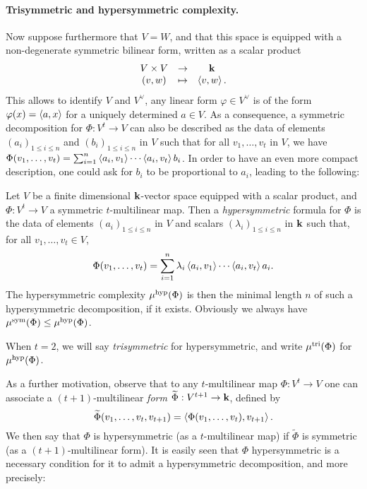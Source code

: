 \documentclass[11pt]{article}
\begin{document}
\paragraph{Trisymmetric and hypersymmetric complexity.}
Now suppose furthermore that $V=W$, and that this space is equipped with a
non-degenerate symmetric bilinear form, written as a scalar product
\[
\begin{array}{ccc}
V\times V &\to&\mathbf{k}\\
(v,w)&\mapsto&\left\langle v,w\right\rangle.
\end{array}
\]
This allows to identify $V$ and $V^\vee$, \ie any linear form $\varphi\in V^\vee$
is of the form $\varphi(x)=\left\langle a,x\right\rangle$ for a uniquely determined $a\in V$.
As a consequence, a symmetric decomposition for $\Phi:V^t\to V$ can also be described
as the data of elements $(a_i)_{1\leq i\leq n}$ and $(b_i)_{1\leq i\leq n}$ in $V$
such that for all $v_1,\dots,v_t$ in $V$,
we have $\Phi(v_1,\dots,v_t)=\sum_{i=1}^{n}\left\langle a_i,v_1\right\rangle\cdots\left\langle a_i,v_t\right\rangle b_i$.
In order to have an even more compact description, one could ask for $b_i$ to be proportional to $a_i$, leading to the following:
\begin{defi}
Let $V$ be a finite dimensional $\mathbf{k}$-vector space equipped with a scalar product,
and $\Phi:V^t\to V$ a symmetric $t$-multilinear map.
Then a \emph{hypersymmetric} formula for $\Phi$ is the data of
elements $(a_i)_{1\leq i\leq n}$ in $V$ and scalars $(\lambda_i)_{1\leq i\leq n}$ in $\mathbf{k}$ such that, for all $v_1,\dots,v_t\in V$,
\[
\Phi(v_1,\dots,v_t)=\sum_{i=1}^{n}\lambda_i\left\langle a_i,v_1\right\rangle\cdots\left\langle a_i,v_t\right\rangle a_i.
\]
The hypersymmetric complexity $\mu^{\textrm{hyp}}(\Phi)$ is then the minimal length $n$ of such a hypersymmetric decomposition, if it exists. Obviously we always have $\mu^{\textrm{sym}}(\Phi)\leq\mu^{\textrm{hyp}}(\Phi)$.

When $t=2$, we will say \emph{trisymmetric} for hypersymmetric,
and write $\mu^{\textrm{tri}}(\Phi)$ for $\mu^{\textrm{hyp}}(\Phi)$.
\end{defi}
As a further motivation, observe that to any $t$-multilinear map $\Phi:V^t\to V$
one can associate a $(t+1)$-multilinear \emph{form} $\widetilde{\Phi}:V^{t+1}\to \mathbf{k}$, defined by
\[
\widetilde{\Phi}(v_1,\dots,v_t,v_{t+1})=\left\langle\Phi(v_1,\dots,v_t),v_{t+1}\right\rangle.
\]
We then say that $\Phi$ is hypersymmetric (as a $t$-multilinear map)
if $\widetilde{\Phi}$ is symmetric (as a $(t+1)$-multilinear form).
It is easily seen that $\Phi$ hypersymmetric is a necessary condition for it to admit a hypersymmetric decomposition, and more precisely:
\end{document}
